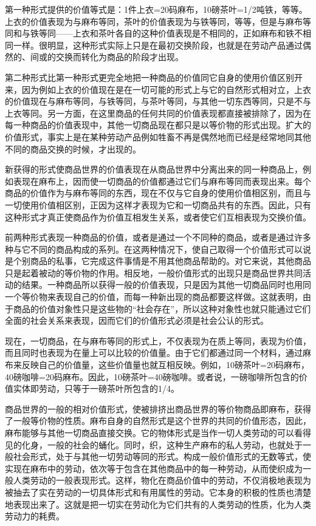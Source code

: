 \documentclass{ctexbook}
\begin{document}
            第一种形式提供的价值等式是：1件上衣=20码麻布，10磅茶叶=1/2吨铁，等等。上衣的价值表现为与麻布等同，茶叶的价值表现为与铁等同，等等，但是与麻布等同和与铁等同——上衣和茶叶各自的这种价值表现是不相同的，正如麻布和铁不相同一样。很明显，这种形式实际上只是在最初交换阶段，也就是在劳动产品通过偶然的、间或的交换而转化为商品的阶段才出现。
            
            第二种形式比第一种形式更完全地把一种商品的价值同它自身的使用价值区别开来，因为例如上衣的价值现在是在一切可能的形式上与它的自然形式相对立，上衣的价值现在与麻布等同，与铁等同，与茶叶等同，与其他一切东西等同，只是不与上衣等同。另一方面，在这里商品的任何共同的价值表现都直接被排除了，因为在每一种商品的价值表现中，其他一切商品现在都只是以等价物的形式出现。扩大的价值形式，事实上是在某种劳动产品例如牲畜不再是偶然地而已经是经常地同其他不同的商品交换的时候，才出现的。
            
            新获得的形式使商品世界的价值表现在从商品世界中分离出来的同一种商品上，例如表现在麻布上，因而使一切商品的价值都通过它们与麻布等同而表现出来。每个商品的价值作为与麻布等同的东西，现在不仅与它自身的使用价值相区别，而且与一切使用价值相区别，正因为这样才表现为它和一切商品共有的东西。因此，只有这种形式才真正使商品作为价值互相发生关系，或者使它们互相表现为交换价值。
            
            前两种形式表现一种商品的价值，或者是通过一个不同种的商品，或者是通过许多种与它不同的商品构成的系列。在这两种情况下，使自己取得一个价值形式可以说是个别商品的私事，它完成这件事情是不用其他商品帮助的。对它来说，其他商品只是起着被动的等价物的作用。相反地，一般价值形式的出现只是商品世界共同活动的结果。一种商品所以获得一般的价值表现，只是因为其他一切商品同时也用同一个等价物来表现自己的价值，而每一种新出现的商品都要这样做。这就表明，由于商品的价值对象性只是这些物的“社会存在”，所以这种对象性也就只能通过它们全面的社会关系来表现，因而它们的价值形式必须是社会公认的形式。
            
            现在，一切商品，在与麻布等同的形式上，不仅表现为在质上等同，表现为价值，而且同时也表现为在量上可以比较的价值量。由于它们都通过同一个材料，通过麻布来反映自己的价值量，这些价值量也就互相反映。例如，10磅茶叶=20码麻布，40磅咖啡=20码麻布。因此，10磅茶叶=40磅咖啡。或者说，一磅咖啡所包含的价值实体即劳动，只等于一磅茶叶所包含的1/4。
            
            商品世界的一般的相对价值形式，使被排挤出商品世界的等价物商品即麻布，获得了一般等价物的性质。麻布自身的自然形式是这个世界的共同的价值形态，因此，麻布能够与其他一切商品直接交换。它的物体形式是当作一切人类劳动的可以看得见的化身，一般的社会的蛹化。同时，织，这种生产麻布的私人劳动，也就处于一般社会形式，处于与其他一切劳动等同的形式。构成一般价值形式的无数等式，使实现在麻布中的劳动，依次等于包含在其他商品中的每一种劳动，从而使织成为一般人类劳动的一般表现形式。这样，物化在商品价值中的劳动，不仅消极地表现为被抽去了实在劳动的一切具体形式和有用属性的劳动。它本身的积极的性质也清楚地表现出来了。这就是把一切实在劳动化为它们共有的人类劳动的性质，化为人类劳动力的耗费。
            
\end{document}
